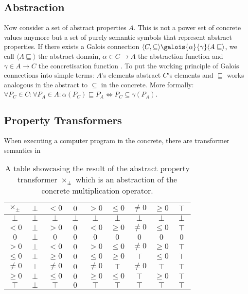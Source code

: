 \documentclass{report}
\begin{document}
\subsection{Abstraction}\label{sec:abstractinterpretation:abstraction}

Now consider a set of abstract properties $A$. This is not a power set of concrete values anymore but a set of purely semantic symbols that represent abstract properties. If there exists a Galois connection $\langle C,\subseteq\rangle \galois{\alpha}{\gamma}\langle A\sqsubseteq\rangle$, we call $\langle A\sqsubseteq\rangle$ the abstract domain, $\alpha\in C\to A$ the abstraction function and $\gamma\in A\to C$ the concretisation function \cite[chapter 11]{cousot2021}. To put the working principle of Galois connections into simple terms: $A$'s elements abstract $C$'s elements and $\sqsubseteq$ works analogous in the abstract to $\subseteq$ in the concrete. More formally: $\forall P_C\in C:\forall P_A \in A:\alpha(P_C)\sqsubseteq P_A \Longleftrightarrow P_C \subseteq \gamma(P_A)$.



\subsection{Property Transformers}

When executing a computer program in the concrete, there are transformer semantics in 

\begin{table}[hbt]
\begin{center}
\begin{tabular}{c|c|c|c|c|c|c|c|c}
            $\times_\pm$& $\perp$ & $<0$    & $0$     & $>0$    & $\leq0$ & $\neq0$ & $\geq0$ & $\top$  \\ \hline
            $\perp$ & $\perp$ & $\perp$ & $\perp$ & $\perp$ & $\perp$ & $\perp$ & $\perp$ & $\perp$ \\
            $<0$    & $\perp$ & $>0$    & $0$     & $<0$    & $\geq0$ & $\neq0$ & $\leq0$ & $\top$  \\
            $0$     & $\perp$ & $0$     & $0$     & $0$     & $0$     & $0$     & $0$     & $0$     \\
            $>0$    & $\perp$ & $<0$    & $0$     & $>0$    & $\leq0$ & $\neq0$ & $\geq0$ & $\top$  \\
            $\leq0$ & $\perp$ & $\geq0$ & $0$     & $\leq0$ & $\geq0$ & $\top$  & $\leq0$ & $\top$  \\
            $\neq0$ & $\perp$ & $\neq0$ & $0$     & $\neq0$ & $\top$  & $\neq0$ & $\top$  & $\top$  \\
            $\geq0$ & $\perp$ & $\leq0$ & $0$     & $\geq0$ & $\leq0$ & $\top$  & $\geq0$ & $\top$  \\
            $\top$  & $\perp$ & $\top$  & $0$     & $\top$  & $\top$  & $\top$  & $\top$  & $\top$ 
        \end{tabular}
  \caption{A table showcasing the result of the abstract property transformer $\times_\pm$ which is an abstraction of the concrete multiplication operator.}\label{table:multiply}
  \end{center}
\end{table}
\end{document}
